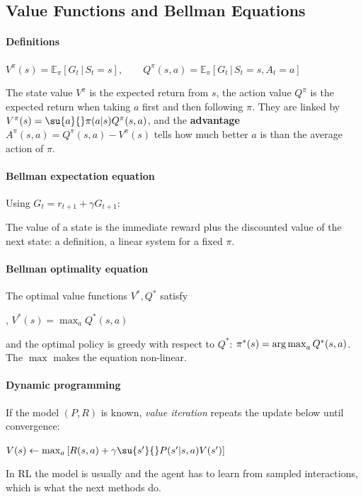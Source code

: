 \subsection{Value Functions and Bellman Equations}
\paragraph{Definitions}
\begin{center}
    $V^{\pi}(s)=\mathbb{E}_{\pi}\left[G_{t}\,|\,S_{t}=s\right],\qquad
    Q^{\pi}(s,a)=\mathbb{E}_{\pi}\left[G_{t}\,|\,S_{t}=s,A_{t}=a\right]$
\end{center}
The state value $V^{\pi}$ is the expected return from $s$, the action value $Q^{\pi}$ is the
expected return when taking $a$ first and then following $\pi$. They are linked by
$V^{\pi}(s)=\su{a}{}\pi(a|s)Q^{\pi}(s,a)$, and the \textbf{advantage}
$A^{\pi}(s,a)=Q^{\pi}(s,a)-V^{\pi}(s)$ tells how much better $a$ is than the average action
of $\pi$.

\paragraph{Bellman expectation equation} Using $G_{t}=r_{t+1}+\gamma G_{t+1}$:
\begin{center}
\end{center}
The value of a state is the immediate reward plus the discounted value of the next state:
a  definition, a linear system for a fixed $\pi$.

\paragraph{Bellman optimality equation} The optimal value functions $V^{*},Q^{*}$ satisfy
\begin{center}
    ,\qquad
    $V^{*}(s)=\max_{a}Q^{*}(s,a)$
\end{center}
and the optimal policy is greedy with respect to $Q^{*}$: $\pi^{*}(s)=\operatorname*{arg\,max}_{a}Q^{*}(s,a)$.
The $\max$ makes the equation non-linear.

\paragraph{Dynamic programming} If the model $(P,R)$ is known, \emph{value iteration}
repeats the update below until convergence:
\begin{center}
    $V(s)\leftarrow\max_{a}\left[R(s,a)+\gamma\su{s'}{}P(s'|s,a)V(s')\right]$
\end{center}
In RL the model is usually  and the agent has to learn from sampled
interactions, which is what the next methods do.

